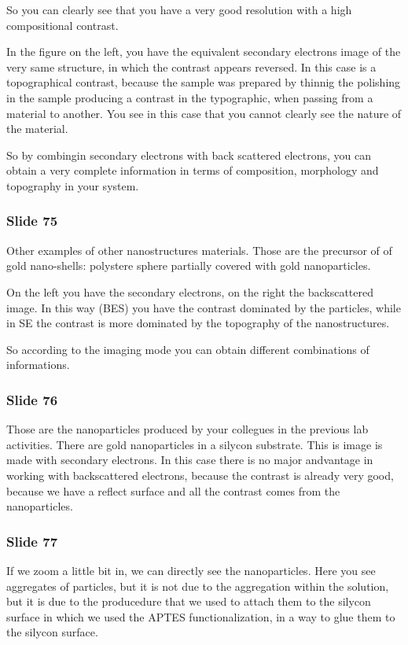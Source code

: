 \documentclass[../main/main.tex]{subfiles}
\begin{document}
So you can clearly see that you have a very good resolution with a high compositional contrast.

In the figure on the left, you have the equivalent secondary electrons image of the  very same structure, in which the contrast appears reversed. In this case is a topographical contrast, because the sample was prepared by thinnig the polishing in the sample producing a contrast in the typographic, when passing from a material to another. You see in this case that you cannot clearly see the nature of the material.

So by combingin secondary electrons with back scattered electrons, you can obtain a very complete information in terms of composition, morphology and topography in your system.

\subsubsection{Slide 75}
Other examples of other nanostructures materials. Those are the precursor of of gold nano-shells: polystere sphere partially covered with gold nanoparticles.

On the left you have the secondary electrons, on the right the backscattered image. In this way (BES) you have the contrast dominated by the particles, while in SE the contrast is more dominated by the topography of the nanostructures.

So according to the imaging mode you can obtain different combinations of informations.


\subsubsection{Slide 76}
Those are the nanoparticles produced by your collegues in the previous lab activities. There are gold nanoparticles in a silycon substrate. This is image is made with secondary electrons. In this case there is no major andvantage in working with backscattered electrons, because the contrast is already very good, because we have a reflect surface and all the contrast comes from the nanoparticles.

\subsubsection{Slide 77}
If we zoom a little bit in, we can directly see the nanoparticles. Here you see aggregates of particles, but it is not due to the aggregation within the solution, but it is due to the producedure that we used to attach them to the silycon  surface in which we used the APTES functionalization, in a way to glue them to the silycon surface.
\end{document}
